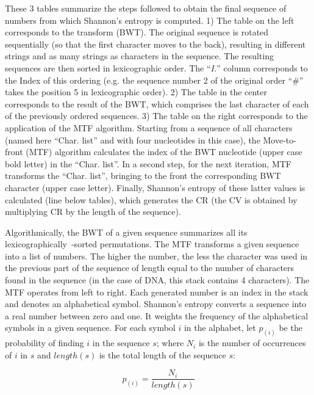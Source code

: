 \begin{table}[!ht]
{    These 3 tables summarize the steps followed to obtain the final sequence of numbers from which Shannon's entropy is computed. 1) The table on the left corresponds to the  transform (BWT). The original sequence is rotated sequentially (so that the first character moves to the back), resulting in different strings and as many strings as characters in the sequence. The resulting sequences are then sorted in lexicographic order. The ``\textit{I.}'' column corresponds to the Index of this ordering (e.g. the sequence number 2 of the original order ``\#'' takes the position 5 in lexicographic order). 2) The table in the center corresponds to the result of the BWT, which comprises the last character of each of the previously ordered sequences. 3) The table on the right corresponds to the application of the MTF algorithm. Starting from a sequence of all characters (named here ``Char. list'' and with four nucleotides in this case), the Move-to-front (MTF) algorithm calculates the index of the BWT nucleotide (upper case bold letter) in the ``Char. list''. In a second step, for the next iteration, MTF transforms the ``Char. list'', bringing to the front the corresponding BWT character (upper case letter). Finally, Shannon's entropy of these latter values is calculated (line below tables), which generates the CR (the CV is obtained by multiplying CR by the length of the sequence).}
  \label{tab:cr_example}
\end{table}

Algorithmically, the BWT of a given sequence summarizes all its lexicographically~-sorted permutations. The MTF transforms a given sequence into a list of numbers. The higher the number, the less the character was used in the previous part of the sequence of length equal to the number of characters found in the sequence (in the case of DNA, this stack contains 4 characters). The MTF operates from left to right. Each generated number is an index in the stack and denotes an alphabetical symbol. Shannon's entropy converts a sequence into a real number between zero and one. It weights the frequency of the alphabetical symbols in a given sequence. For each symbol $i$ in the alphabet, let $p_{(i)}$ be the probability of finding $i$ in the sequence $s$; where $N_i$ is the number of occurrences of $i$ in $s$ and $length(s)$ is the total length of the sequence $s$: 

\begin{equation} \label{eq:prob_seq}
p_{(i)} = \frac {N_i}{length(s)}
\end{equation}

